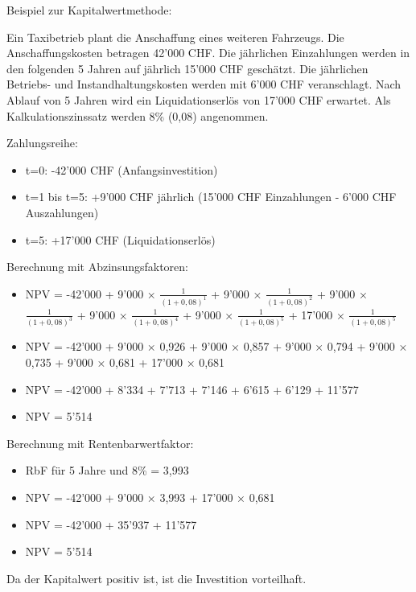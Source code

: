 \begin{example}
Beispiel zur Kapitalwertmethode:

Ein Taxibetrieb plant die Anschaffung eines weiteren Fahrzeugs. Die Anschaffungskosten betragen 42'000 CHF. Die jährlichen Einzahlungen werden in den folgenden 5 Jahren auf jährlich 15'000 CHF geschätzt. Die jährlichen Betriebs- und Instandhaltungskosten werden mit 6'000 CHF veranschlagt. Nach Ablauf von 5 Jahren wird ein Liquidationserlös von 17'000 CHF erwartet. Als Kalkulationszinssatz werden 8\% (0,08) angenommen.

Zahlungsreihe:
\begin{itemize}
    \item t=0: -42'000 CHF (Anfangsinvestition)
    \item t=1 bis t=5: +9'000 CHF jährlich (15'000 CHF Einzahlungen - 6'000 CHF Auszahlungen)
    \item t=5: +17'000 CHF (Liquidationserlös)
\end{itemize}

Berechnung mit Abzinsungsfaktoren:
\begin{itemize}
    \item NPV = -42'000 + 9'000 × $\frac{1}{(1+0,08)^1}$ + 9'000 × $\frac{1}{(1+0,08)^2}$ + 9'000 × $\frac{1}{(1+0,08)^3}$ + 9'000 × $\frac{1}{(1+0,08)^4}$ + 9'000 × $\frac{1}{(1+0,08)^5}$ + 17'000 × $\frac{1}{(1+0,08)^5}$
    \item NPV = -42'000 + 9'000 × 0,926 + 9'000 × 0,857 + 9'000 × 0,794 + 9'000 × 0,735 + 9'000 × 0,681 + 17'000 × 0,681
    \item NPV = -42'000 + 8'334 + 7'713 + 7'146 + 6'615 + 6'129 + 11'577
    \item NPV = 5'514
\end{itemize}

Berechnung mit Rentenbarwertfaktor:
\begin{itemize}
    \item RbF für 5 Jahre und 8\% = 3,993
    \item NPV = -42'000 + 9'000 × 3,993 + 17'000 × 0,681
    \item NPV = -42'000 + 35'937 + 11'577
    \item NPV = 5'514
\end{itemize}

Da der Kapitalwert positiv ist, ist die Investition vorteilhaft.
\end{example}

